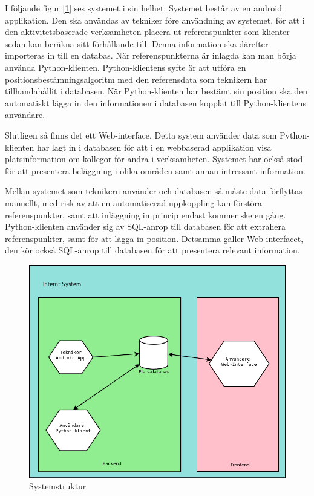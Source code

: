 \documentclass[swedish, a4paper,12pt]{article}
\begin{document}
I följande figur [\ref{fig:systemStruktur}] ses systemet i sin helhet. Systemet består av en android applikation. Den ska användas av tekniker före användning av systemet, för att i den aktivitetsbaserade verksamheten placera ut referenspunkter som klienter sedan kan beräkna sitt förhållande till. Denna information ska därefter importeras in till en databas. När referenspunkterna är inlagda kan man börja använda Python-klienten. Python-klientens syfte är att utföra en positionsbestämningsalgoritm med den referensdata som teknikern har tillhandahållit i databasen. När Python-klienten har bestämt sin position ska den automatiskt lägga in den informationen i databasen kopplat till Python-klientens användare.

Slutligen så finns det ett Web-interface. Detta system använder data som Python-klienten har lagt in i databasen för att i en webbaserad applikation visa platsinformation om kollegor för andra i verksamheten. Systemet har också stöd för att presentera beläggning i olika områden samt annan intressant information.

Mellan systemet som teknikern använder och databasen så måste data förflyttas manuellt, med risk av att en automatiserad uppkoppling kan förstöra referenspunkter, samt att inläggning in princip endast kommer ske en gång. Python-klienten använder sig av SQL-anrop till databasen för att extrahera referenspunkter, samt för att lägga in position. Detsamma gäller Web-interfacet, den kör också SQL-anrop till databasen för att presentera relevant information. %

\begin{figure}[H]
	\includegraphics[width=15cm]{media/systemStruktur.png}
	\caption{Systemstruktur}
	\label{fig:systemStruktur}
\end{figure}
\end{document}
